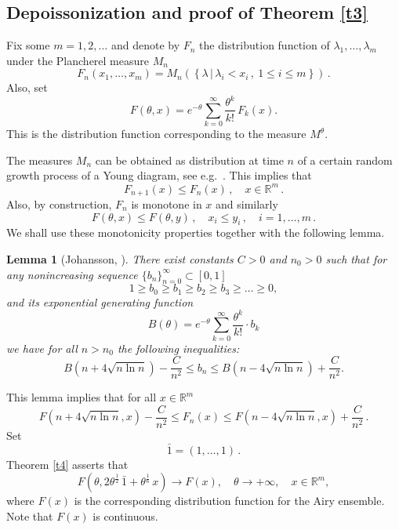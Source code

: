 \documentclass[12pt]{amsart}
\newcommand{\la}{\lambda}
\newcommand{\R}{\mathbb{R}}
\newcommand{\bo}{\bar 1}
\newcommand{\ix}{\theta}
\theoremstyle{plain}
\newtheorem{lemma}{Lemma}[section]
\theoremstyle{definition}
\numberwithin{equation}{section}
\begin{document}
\subsection{Depoissonization and proof of Theorem \ref{t3}}\label{s43}

Fix some $m=1,2,\dots$ and denote by $F_n$ the distribution
function of $\la_1,\dots,\la_m$ under the Plancherel measure $M_n$
%
\begin{equation*}
F_n(x_1,\dots,x_m)=M_n\left(\left\{\la\,\left|\,
\la_i< x_i\,, \  1\le i\le 
m\right.\right\}\right) \,.
\end{equation*}
%
Also, set
%
\begin{equation*}
F(\ix,x)=e^{-\ix} \sum_{k=0}^\infty\frac {\ix^k}{k!}\, F_k(x).
\end{equation*}
%
This is the distribution function corresponding to the measure $M^\ix$. 


The measures $M_n$ can be obtained as distribution at time $n$ of
a certain random growth process of a Young diagram, see e.g.\ \cite{VK2}. This implies
that
%
\begin{equation*}
F_{n+1}(x)\le F_n(x)\,, \quad x\in\R^m \,.
\end{equation*}
%
Also, by construction, $F_n$ is monotone in $x$ and similarly 
%
\begin{equation}\label{e4101}
F(\ix,x) \le F(\ix,y)\,, \quad x_i \le y_i\,, \quad i=1,\dots,m \,. 
\end{equation}
%
We shall use these monotonicity properties 
together with the following lemma.  

\begin{lemma}[Johansson, \cite{J}]\label{l48}
 There exist constants $C>0$ and $n_0>0$ such that for 
any nonincreasing sequence $\{b_n\}_{n=0}^\infty\subset[0,1]$ 
%
\begin{equation*}
1\ge b_0\ge b_1\ge b_2\ge b_3\ge\dots\ge 0,
\end{equation*}
%
and its exponential generating function 
%
\begin{equation*}
B(\ix)=e^{-\ix} \sum_{k=0}^\infty\frac {\ix^k}{k!}\cdot b_k
\end{equation*}
%
we have for all $n>n_0$ the following inequalities:
%
\begin{equation*}
B(n+4\sqrt{n\ln n})-\frac C{n^2}\le b_n\le B(n-4\sqrt{n\ln n})+\frac C{n^2}.
\end{equation*}
%
\end{lemma}

This  lemma implies that for all $x\in \R^m$ 
%
\begin{equation}\label{e411}
F(n+4\sqrt{n\ln n},x)-\frac C{n^2}\le F_n(x)\le F(n-4\sqrt{n\ln n},x)+\frac 
C{n^2}\,.
\end{equation}
%
Set 
%
\begin{equation*}
\bo=(1,\dots,1)\,.
\end{equation*}
% 
Theorem \ref{t4} asserts  that 
%
\begin{equation}\label{e412}
F\left(\ix, 2{\ix}^\frac12\, \bo + \ix^{\frac 16} \, x\right)\to F(x),\quad \ix\to +\infty,\quad x\in 
\R^m,
\end{equation}
%
where $F(x)$ is the corresponding distribution
function for the Airy ensemble. Note that $F(x)$ is continuous. 
\end{document}
